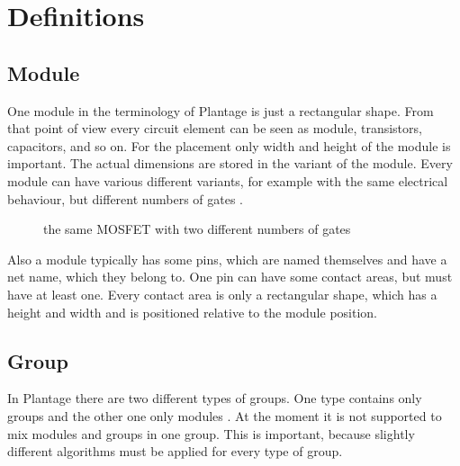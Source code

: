 \chapter{Definitions}

\section{Module}
One module in the terminology of Plantage is just a rectangular shape. From that point of view every circuit element can be seen as module, transistors, capacitors, and so on. For the placement only width and height of the module is important. The actual dimensions are stored in the variant of the module. Every module can have various different variants, for example with the same electrical behaviour, but different numbers of gates .

\begin{figure}
	\centering
	
	\caption{the same MOSFET with two different numbers of gates}
	\label{fig:modules_with_different_gate_number}
\end{figure}

Also a module typically has some pins, which are named themselves and have a net name, which they belong to. One pin can have some contact areas, but must have at least one. Every contact area is only a rectangular shape, which has a height and width and is positioned relative to the module position.

\section{Group}
In Plantage there are two different types of groups. One type contains only groups and the other one only modules . At the moment it is not supported to mix modules and groups in one group. This is important, because slightly different algorithms must be applied for every type of group.


